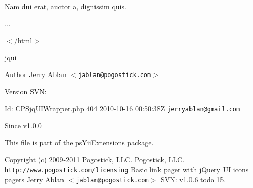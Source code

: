 {\ttfamily  Nam dui erat, auctor a, dignissim quis.  }

{\ttfamily  ...}

{\ttfamily  $<$/html$>$ }

jqui

\begin{DoxyAuthor}{Author}
Jerry Ablan $<$\href{mailto:jablan@pogostick.com}{\tt jablan@pogostick.com}$>$ 
\end{DoxyAuthor}
\begin{DoxyVersion}{Version}
SVN: 
\end{DoxyVersion}
\begin{DoxyParagraph}{Id:}
\hyperlink{CPSjqUIWrapper_8php}{CPSjqUIWrapper.php} 404 2010-\/10-\/16 00:50:38Z \href{mailto:jerryablan@gmail.com}{\tt jerryablan@gmail.com} 
\end{DoxyParagraph}
\begin{DoxySince}{Since}
v1.0.0
\end{DoxySince}


This file is part of the \hyperlink{namespacepsYiiExtensions}{psYiiExtensions} package.

Copyright (c) 2009-\/2011 Pogostick, LLC. \hyperlink{}{Pogostick, LLC.  \href{http://www.pogostick.com/licensing}{\tt http://www.pogostick.com/licensing} Basic link pager with jQuery UI icons   pagers   Jerry Ablan $<$\href{mailto:jablan@pogostick.com}{\tt jablan@pogostick.com}$>$  SVN:   v1.0.6    todo 15. }